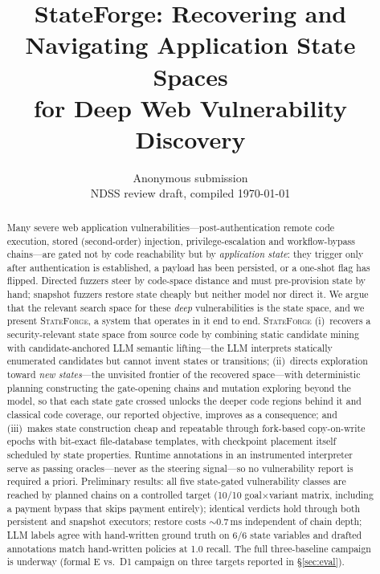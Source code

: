 \documentclass[letterpaper,twocolumn,10pt]{article}
\newcommand{\sys}{\textsc{StateForge}}
\begin{document}
\date{}
\title{\Large \bf StateForge: Recovering and Navigating Application State Spaces\\ for Deep Web Vulnerability Discovery}
\author{{\normalsize Anonymous submission}\\[-2mm]
{\normalsize NDSS review draft, compiled \today}}
\maketitle

\begin{abstract}
Many severe web application vulnerabilities---post-authentication remote code execution, stored (second-order) injection, privilege-escalation and workflow-bypass chains---are gated not by code reachability but by \emph{application state}: they trigger only after authentication is established, a payload has been persisted, or a one-shot flag has flipped. Directed fuzzers steer by code-space distance and must pre-provision state by hand; snapshot fuzzers restore state cheaply but neither model nor direct it. We argue that the relevant search space for these \emph{deep} vulnerabilities is the state space, and we present \sys{}, a system that operates in it end to end. \sys{} (i)~recovers a security-relevant state space from source code by combining static candidate mining with candidate-anchored LLM semantic lifting---the LLM interprets statically enumerated candidates but cannot invent states or transitions; (ii)~directs exploration toward \emph{new states}---the unvisited frontier of the recovered space---with deterministic planning constructing the gate-opening chains and mutation exploring beyond the model, so that each state gate crossed unlocks the deeper code regions behind it and classical code coverage, our reported objective, improves as a consequence; and (iii)~makes state construction cheap and repeatable through fork-based copy-on-write epochs with bit-exact file-database templates, with checkpoint placement itself scheduled by state properties. Runtime annotations in an instrumented interpreter serve as passing oracles---never as the steering signal---so no vulnerability report is required a priori. Preliminary results: all five state-gated vulnerability classes are reached by planned chains on a controlled target (10/10 goal$\times$variant matrix, including a payment bypass that skips payment entirely); identical verdicts hold through both persistent and snapshot executors; restore costs ${\sim}0.7$\,ms independent of chain depth; LLM labels agree with hand-written ground truth on 6/6 state variables and drafted annotations match hand-written policies at 1.0 recall. The full three-baseline campaign is underway (formal E vs.\ D1 campaign on three targets reported in \S\ref{sec:eval}). %
\end{abstract}
\end{document}
